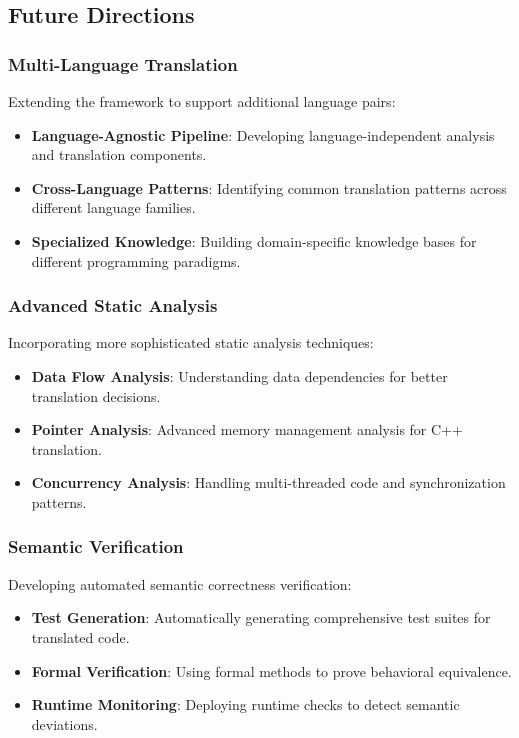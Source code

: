 \subsection{Future Directions}

\subsubsection{Multi-Language Translation}
Extending the framework to support additional language pairs:

\begin{itemize}
\item \textbf{Language-Agnostic Pipeline}: Developing language-independent analysis and translation components.
\item \textbf{Cross-Language Patterns}: Identifying common translation patterns across different language families.
\item \textbf{Specialized Knowledge}: Building domain-specific knowledge bases for different programming paradigms.
\end{itemize}

\subsubsection{Advanced Static Analysis}
Incorporating more sophisticated static analysis techniques:

\begin{itemize}
\item \textbf{Data Flow Analysis}: Understanding data dependencies for better translation decisions.
\item \textbf{Pointer Analysis}: Advanced memory management analysis for C++ translation.
\item \textbf{Concurrency Analysis}: Handling multi-threaded code and synchronization patterns.
\end{itemize}

\subsubsection{Semantic Verification}
Developing automated semantic correctness verification:

\begin{itemize}
\item \textbf{Test Generation}: Automatically generating comprehensive test suites for translated code.
\item \textbf{Formal Verification}: Using formal methods to prove behavioral equivalence.
\item \textbf{Runtime Monitoring}: Deploying runtime checks to detect semantic deviations.
\end{itemize}

